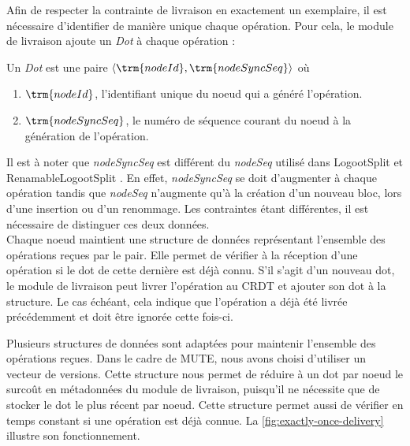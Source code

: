 \label{sec:mute-exactly-once-delivery}

Afin de respecter la contrainte de livraison en exactement un exemplaire, il est nécessaire d'identifier de manière unique chaque opération.
Pour cela, le module de livraison ajoute un \emph{Dot} \cite{2014-scalable-accurate-causality-tracking} à chaque opération :

\begin{definition}[Dot]
  \label{def:dot}
  Un \emph{Dot} est une paire $\langle \trm{nodeId}, \trm{nodeSyncSeq}\rangle$ où
  \begin{enumerate}
    \item $\trm{nodeId}$, l'identifiant unique du noeud qui a généré l'opération.
    \item $\trm{nodeSyncSeq}$, le numéro de séquence courant du noeud à la génération de l'opération.
  \end{enumerate}
\end{definition}

Il est à noter que \emph{nodeSyncSeq} est différent du \emph{nodeSeq} utilisé dans LogootSplit et RenamableLogootSplit .
En effet, \emph{nodeSyncSeq} se doit d'augmenter à chaque opération tandis que \emph{nodeSeq} n'augmente qu'à la création d'un nouveau bloc, \ie lors d'une insertion ou d'un renommage.
Les contraintes étant différentes, il est nécessaire de distinguer ces deux données.\\

Chaque noeud maintient une structure de données représentant l'ensemble des opérations reçues par le pair.
Elle permet de vérifier à la réception d'une opération si le dot de cette dernière est déjà connu.
S'il s'agit d'un nouveau dot, le module de livraison peut livrer l'opération au \ac{CRDT} et ajouter son dot à la structure.
Le cas échéant, cela indique que l'opération a déjà été livrée précédemment et doit être ignorée cette fois-ci.

Plusieurs structures de données sont adaptées pour maintenir l'ensemble des opérations reçues.
Dans le cadre de MUTE, nous avons choisi d'utiliser un vecteur de versions.
Cette structure nous permet de réduire à un dot par noeud le surcoût en métadonnées du module de livraison, puisqu'il ne nécessite que de stocker le dot le plus récent par noeud.
Cette structure permet aussi de vérifier en temps constant si une opération est déjà connue.
La \autoref{fig:exactly-once-delivery} illustre son fonctionnement.\\

